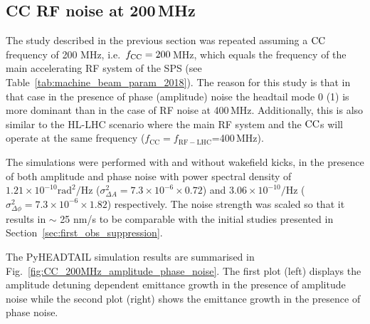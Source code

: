 \subsection{CC RF noise at 200\,MHz}\label{subsec:fcc_200MHz}
 The study described in the previous section was repeated assuming a ${\mathrm{CC}}$ frequency of 200 MHz, i.e.~${f_\mathrm{CC}}=200$\,MHz, which equals the frequency of the main accelerating RF system of the SPS (see Table~\ref{tab:machine_beam_param_2018}). The reason for this study is that in that case in the presence of phase (amplitude) noise the headtail mode 0 (1) is more dominant than in the case of RF noise at 400\,MHz. Additionally, this is also similar to the HL-LHC scenario where the main RF system and the ${\mathrm{CC}}$s will operate at the same frequency ($f_\mathrm{CC}=f_\mathrm{RF-LHC}$=400\,MHz).

The simulations were performed with and without wakefield kicks, in the presence of both amplitude and phase noise with power spectral density of $1.21 \times 10^{-10} \mathrm{rad^2/Hz}$ ($\sigma_{\Delta A}^2=7.3 \times 10^{-6} \times 0.72$) and $3.06 \times 10^{-10} \mathrm{/Hz}$ ($\sigma_{\Delta \phi}^2=7.3 \times 10^{-6} \times 1.82$) respectively. The noise strength was scaled so that it results in $\sim$ 25 nm/s to be comparable with the initial studies presented in Section~\ref{sec:first_obs_suppression}.

The PyHEADTAIL simulation results are summarised in Fig.~\ref{fig:CC_200MHz_amplitude_phase_noise}. The first plot (left) displays the amplitude detuning dependent emittance growth in the presence of amplitude noise while the second plot (right) shows the emittance growth in the presence of phase noise. 

